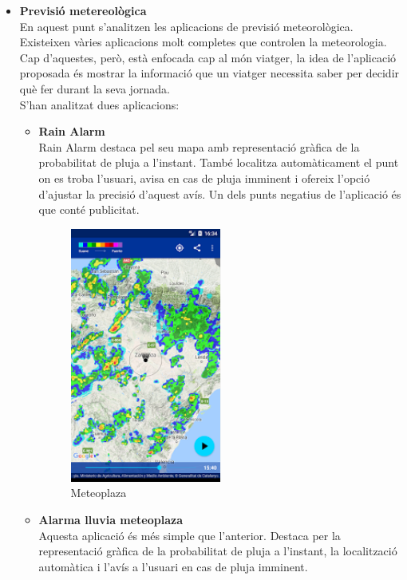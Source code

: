 \begin{itemize}
\begin{itemize}
\end{itemize}
\item{\textbf{Previsió metereològica}}\\
En aquest punt s'analitzen les aplicacions de previsió meteorològica. Existeixen vàries aplicacions molt completes que controlen la meteorologia. Cap d'aquestes, però, està enfocada cap al món viatger, la idea de l'aplicació proposada és mostrar la informació que un viatger necessita saber per decidir què fer durant la seva jornada.\\
S'han analitzat dues aplicacions:
\begin{itemize}
\item{\textbf{Rain Alarm}}\\
Rain Alarm destaca pel seu mapa amb representació gràfica de la probabilitat de pluja a l'instant. També localitza automàticament el punt on es troba l'usuari, avisa en cas de pluja imminent i ofereix l'opció d'ajustar la precisió d'aquest avís. Un dels punts negatius de l'aplicació és que conté publicitat.

\begin{figure}[!h]
\centering
\includegraphics[scale=0.90]{Figures/rainAlarm.jpg}
\caption{Meteoplaza}
\end{figure}

\item{\textbf{Alarma lluvia meteoplaza}}\\
Aquesta aplicació és més simple que l'anterior. Destaca per la representació gràfica de la probabilitat de pluja a l'instant, la localització automàtica i l'avís a l'usuari en cas de pluja imminent.


\end{itemize}
\end{itemize}

